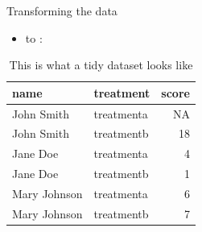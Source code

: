 \documentclass[10pt,ignorenonframetext,]{beamer}
\newenvironment{Shaded}{\begin{snugshade}}{\end{snugshade}}
\newcommand{\DataTypeTok}[1]{\textcolor[rgb]{0.13,0.29,0.53}{#1}}
\newcommand{\DecValTok}[1]{\textcolor[rgb]{0.00,0.00,0.81}{#1}}
\newcommand{\KeywordTok}[1]{\textcolor[rgb]{0.13,0.29,0.53}{\textbf{#1}}}
\newcommand{\NormalTok}[1]{#1}
\newcommand{\OperatorTok}[1]{\textcolor[rgb]{0.81,0.36,0.00}{\textbf{#1}}}
\newcommand{\OtherTok}[1]{\textcolor[rgb]{0.56,0.35,0.01}{#1}}
\newcommand{\StringTok}[1]{\textcolor[rgb]{0.31,0.60,0.02}{#1}}
\providecommand{\tightlist}{%
  \setlength{\itemsep}{0pt}\setlength{\parskip}{0pt}}
\begin{document}
\begin{frame}[fragile]{Transforming the data}
\protect\hypertarget{transforming-the-data-1}{}

\begin{itemize}
\tightlist
\item
  to :
\end{itemize}

\begin{Shaded}
\end{Shaded}

\begin{table}

\caption{\label{tab:unnamed-chunk-6}This is what a tidy dataset looks like}
\centering
\begin{tabular}[t]{llr}
\toprule
name & treatment & score\\
\midrule
\rowcolor{gray!6}  John Smith & treatmenta & NA\\
John Smith & treatmentb & 18\\
\rowcolor{gray!6}  Jane Doe & treatmenta & 4\\
Jane Doe & treatmentb & 1\\
\rowcolor{gray!6}  Mary Johnson & treatmenta & 6\\
\addlinespace
Mary Johnson & treatmentb & 7\\
\bottomrule
\end{tabular}
\end{table}

\end{frame}
\end{document}
